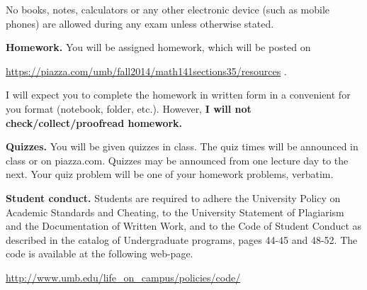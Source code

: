 \documentclass{article}
\begin{document}
No books, notes, calculators or any other electronic device (such as mobile phones) are allowed during any exam unless otherwise stated.

\medskip
\noindent \textbf{Homework.} You will be assigned homework, which will be posted on

\url{https://piazza.com/umb/fall2014/math141sections35/resources} \quad \quad \quad .

\noindent I will expect you to complete the homework in written form in a convenient for you format (notebook, folder, etc.). However, \textbf{I will not check/collect/proofread homework.} 
 
\medskip
\noindent \textbf{Quizzes.} You will be given quizzes in class. The quiz times will be announced in class or on piazza.com. Quizzes may be announced from one lecture day to the next. Your quiz problem will be one of your homework problems, verbatim. 

\medskip
\noindent \textbf{Student conduct.} Students  are required to adhere the University Policy on Academic Standards and Cheating, to the University Statement of Plagiarism and the Documentation of Written Work, and to the Code of Student Conduct as described in the catalog of Undergraduate programs, pages 44-45 and 48-52. The code is available at the following web-page.

\noindent\url{http://www.umb.edu/life_on_campus/policies/code/}
\end{document}

